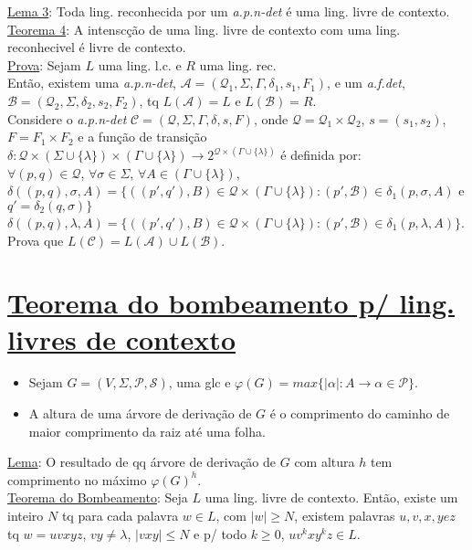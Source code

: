 \documentclass{article}
\begin{document}
\vspace{0.5cm}
\underline{Lema 3}: Toda ling. reconhecida por um \emph{a.p.n-det} é uma ling. livre de contexto.
\vspace{0.5cm}\\
\underline{Teorema 4}: A intenscção de uma ling. livre de contexto com uma ling. reconhecivel é livre de contexto.\\
\underline{Prova}: Sejam $L$ uma ling. l.c. e $R$ uma ling. rec.\\
Então, existem uma \emph{a.p.n-det}, $ \mathcal{A} = (\mathcal{Q}_1,\Sigma,\Gamma,\delta_1,s_1,F_1) $, e
    um \emph{a.f.det}, $ \mathcal{B} = (\mathcal{Q}_2,\Sigma,\delta_2,s_2,F_2) $, tq $L(\mathcal{A}) = L$ e 
    $L(\mathcal{B}) = R$.\\
Considere o \emph{a.p.n-det} $\mathcal{C} = (\mathcal{Q},\Sigma,\Gamma,\delta,s,F)$, onde 
    $ \mathcal{Q} = \mathcal{Q}_1 \times \mathcal{Q}_2 $, $ s = (s_1,s_2) $, $ F = F_1 \times F_2 $ e 
    a função de transição $ \delta : \mathcal{Q} \times (\Sigma \cup \{\lambda\}) \times (\Gamma \cup \{\lambda\} ) 
        \rightarrow 2^{\mathcal{Q} \times (\Gamma \cup \{\lambda\}) } $ 
    é definida por:\\
$ \forall(p,q) \in \mathcal{Q}$, $ \forall \sigma \in \Sigma$, $\forall A \in (\Gamma \cup\{\lambda\})$,\\
    $\delta((p,q), \sigma, A) = \{((p\prime,q\prime), B) \in \mathcal{Q} \times (\Gamma \cup\{\lambda\}): 
        (p\prime,\mathcal{B}) \in \delta_1(p,\sigma,A)$ e $ q\prime = \delta_2(q,\sigma) \}$\\
    $\delta((p,q), \lambda, A) = \{((p\prime,q\prime), B) \in \mathcal{Q} \times (\Gamma \cup\{\lambda\}): 
        (p\prime,\mathcal{B}) \in \delta_1(p,\lambda,A)\}$.
\vspace{0.3cm}\\
Prova que $ L(\mathcal{C}) = L(\mathcal{A}) \cup L(\mathcal{B}) $.

\section{\underline{Teorema do bombeamento p/ ling. livres de contexto}}
\begin{itemize}
    \item Sejam $ G = (V,\Sigma,\mathcal{P},\mathcal{S}) $, uma glc e $ \varphi(G) = max\{ |\alpha|: A \rightarrow \alpha
        \in \mathcal{P} \}. $
    \item A altura de uma árvore de derivação de $G$ é o comprimento do caminho de maior comprimento da raiz até uma folha.
\end{itemize}

\underline{Lema}: O resultado de qq árvore de derivação de $G$ com altura $h$ tem comprimento no máximo $\varphi(G)^h$.
\vspace{0.3cm}\\
\underline{Teorema do Bombeamento}: Seja $L$ uma ling. livre de contexto. Então, existe um inteiro $N$ tq para cada
palavra $ w \in L$, com $ |w| \geq N $, existem palavras $ u, v, x, y e z $ tq $w = uvxyz$, $ vy \neq \lambda $,
$ |vxy| \leq N$ e p/ todo $ k \geq 0$, $uv^kxy^kz \in L $.
\end{document}
